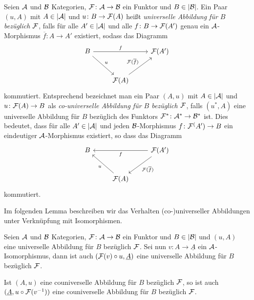 \begin{defn}
  Seien $\mathcal{A}$ und $\mathcal{B}$ Kategorien, $\mathcal{F} \colon \mathcal{A} \to \mathcal{B}$ ein Funktor und $B \in |\mathcal{B}|$.
  Ein Paar $(u, A)$ mit $A \in |\mathcal{A}|$ und $u \colon B \to \mathcal{F}(A)$ heißt \emph{universelle Abbildung für $B$ bezüglich $\mathcal{F}$}, falls für alle $A' \in |\mathcal{A}|$ und alle $f \colon B \to \mathcal{F}(A')$ genau ein $\mathcal{A}$-Morphismus $\overline f \colon A \to A'$ existiert, sodass das Diagramm
  $$
  \begin{tikzcd}[row sep=2.5em]
    B \arrow[rd,"u"] \arrow[rr, "f"] &&\F(A') \\
    &\F(A) \arrow[ru, "\F(\overline{f})"]
  \end{tikzcd}
  $$
  kommutiert.
  Entsprechend bezeichnet man ein Paar $(A,u)$ mit $A \in |\mathcal{A}|$ und $u \colon \mathcal{F}(A) \to B$ als \emph{co-universelle Abbildung für $B$ bezüglich $\mathcal{F}$}, falls $(u^*, A)$ eine universelle Abbildung für $B$ bezüglich des Funktors $\mathcal{F}^* \colon \mathcal{A}^* \to \mathcal{B}^*$ ist.
  Dies bedeutet, dass für alle $A' \in |\mathcal{A}|$ und jeden $\mathcal{B}$-Morphismus $f \colon \mathcal{F}^(A') \to B$ ein eindeutiger $\mathcal{A}$-Morphismus existiert, so dass das Diagramm
  $$
  \begin{tikzcd}[row sep=2.5em]
    B  &&  \arrow[ll, "f"] \F(A')\arrow[ld, "\F(\overline{f})"]  \\
    & \arrow[lu,"u"]\F(A) & 
  \end{tikzcd}
  $$
  kommutiert.
\end{defn}

Im folgenden Lemma beschreiben wir das Verhalten (co-)universeller Abbildungen unter Verknüpfung mit Isomorphismen.

\begin{lem}
  \label{lem:universalCircIso}
  Seien $\mathcal{A}$ und $\mathcal{B}$ Kategorien, $\mathcal{F} \colon \mathcal{A} \to \mathcal{B}$ ein Funktor und $B \in |\mathcal{B}|$ und $(u,A)$ eine universelle Abbildung für $B$ bezüglich $\mathcal{F}$.
  Sei nun $v \colon A \to \underline A$ ein $\mathcal{A}$-Isomorphismus, dann ist auch $(\mathcal{F}(v) \circ u, \underline A )$ eine universelle Abbildung für $B$ bezüglich $\mathcal{F}$.

  Ist $(A, u)$ eine couniverselle Abbildung für $B$ bezüglich $\mathcal{F}$, so ist auch $(\underline A, u \circ \mathcal{F}(v^{-1}))$ eine couniverselle Abbildung für $B$ bezüglich $\mathcal{F}$.
\end{lem}

